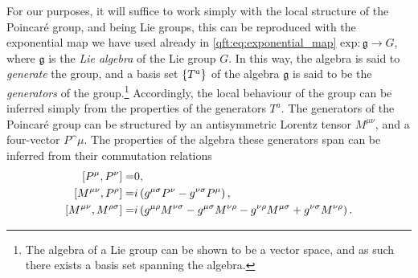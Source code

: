 \documentclass[../main.tex]{subfiles}
\begin{document}
For our purposes, it will suffice to work simply with the local structure of the Poincaré group, and being Lie groups, this can be reproduced with the exponential map we have used already in \cref{qft:eq:exponential_map} \(\text{exp} : \mathfrak{g} \to G\), where \(\mathfrak{g}\) is the \emph{Lie algebra} of the Lie group \(G\).
In this way, the algebra is said to \emph{generate} the group, and a basis set \(\left\{T^a\right\}\) of the algebra \(\mathfrak{g}\) is said to be the \emph{generators} of the group.\footnote{The algebra of a Lie group can be shown to be a vector space, and as such there exists a basis set spanning the algebra.}
Accordingly, the local behaviour of the group can be inferred simply from the properties of the generators \(T^a\).
The generators of the Poincaré group can be structured by an antisymmetric Lorentz tensor \(M^{\mu\nu}\), and a four-vector \(P\^\mu\).
The properties of the algebra these generators span can be inferred from their commutation relations
\begin{subequations}
  \begin{align}
    \label{susy:eq:poincare_commutation1}
    \commutator{P\^\mu}{P\^\nu} =             & 0,                                                                                                                                                \\
    \label{susy:eq:poincare_commutation2}
    \commutator{M^{\mu\nu}}{P^\rho} =         & i\pclosed{\metric{\mu}{\sigma} P^\nu - \metric{\nu}{\sigma} P^\mu},                                                                               \\
    \label{susy:eq:poincare_commutation3}
    \commutator{M^{\mu\nu}}{M^{\rho\sigma}} = & i\pclosed{\metric{\mu}{\rho}M^{\nu\sigma} - \metric{\mu}{\sigma}M^{\nu\rho} - \metric{\nu}{\rho}M^{\mu\sigma} + \metric{\nu}{\sigma}M^{\nu\rho}}.
  \end{align}
\end{subequations}
\end{document}
